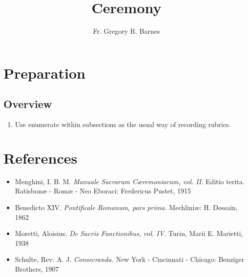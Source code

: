 \documentclass[letterpaper, twocolumn]{article}
\title{Ceremony}
\author{Fr. Gregory R. Barnes}
\begin{document}
	\maketitle
\section*{Preparation}
\subsection*{Overview}
\begin{enumerate}
	\item Use enumerate within subsections as the usual way of recording
		rubrics.
\end{enumerate}
\section*{References}
\begin{itemize}
	\item Menghini, I. B. M. \textit{Manuale Sacrarum Cæremoniarum, vol. II.} Editio terita. Ratisbonæ - Romæ - Neo Eboraci: Fredericus Pustet, 1915
	\item Benedicto XIV. \textit{Pontificale Romanum, pars prima.} Mechliniæ: H. Dessain, 1862
	\item Moretti, Aloisius. \textit{De Sacris Functionibus, vol. IV.} Turin, Marii E. Marietti, 1938
	\item Schulte, Rev. A. J. \textit{Consecranda.} New York - Cincinnati - Chicago: Benziger Brothers, 1907
\end{itemize}
\end{document}
